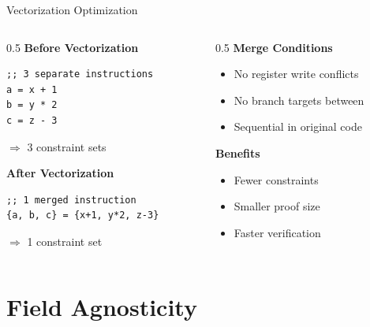 \documentclass[aspectratio=169,11pt]{beamer}
\begin{document}
\begin{frame}[fragile]{Vectorization Optimization}

\begin{columns}
\begin{column}{0.5\textwidth}
\textbf{Before Vectorization}
\begin{lstlisting}[style=zkasm]
;; 3 separate instructions
a = x + 1
b = y * 2
c = z - 3
\end{lstlisting}

\vspace{0.5em}
$\Rightarrow$ 3 constraint sets

\vspace{1em}
\textbf{After Vectorization}
\begin{lstlisting}[style=zkasm]
;; 1 merged instruction
{a, b, c} = {x+1, y*2, z-3}
\end{lstlisting}

\vspace{0.5em}
$\Rightarrow$ 1 constraint set
\end{column}

\begin{column}{0.5\textwidth}
\textbf{Merge Conditions}
\begin{itemize}
    \item No register write conflicts
    \item No branch targets between
    \item Sequential in original code
\end{itemize}

\vspace{0.5em}
\textbf{Benefits}
\begin{itemize}
    \item Fewer constraints
    \item Smaller proof size
    \item Faster verification
\end{itemize}
\end{column}
\end{columns}
\end{frame}

\section{Field Agnosticity}
\end{document}
